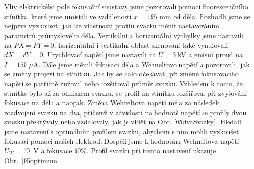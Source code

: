 Vliv elektrického pole fokusační soustavy jsme pozorovali pomocí fluorescenčního stínítka, které jsme umístili ve vzdálenosti $x = 195$ mm od děla. Rozhodli jsme se nejprve vyzkoušet, jak lze vlastnosti profilu svazku měnit nastavováním parametrů průmyslového děla. Vertikální a horizontální výchylky jsme nastavili na $PX = PY = 0$, horizontální i vertikální oblast skenování také vynulovali $dX = dY = 0$. Urychlovací napětí jsme nastavili na $U = 3$ kV a emisní proud na $I = 150$ $\mu$A. Dále jsme měnili fokusaci děla a Wehneltovo napětí a pozorovali, jak se změny projeví na stínítku. Jak by se dalo očekávat, při změně fokusovacího napětí se patřičně zužoval nebo rozšiřoval průměr svazku. Vzhledem k tomu, že stínítko bylo až za ohniskem svazku, se profil na stínítku rozšiřoval při zvyšování fokusace na dělu a naopak. Změna Wehneltova napětí měla za následek rozdvojení svazku na dva, přičemž v závislosti na hodnotě napětí se profily dvou svazků překrývaly nebo vzdalovaly, jak je vidět na Obr. \ref{05dvaSvazky}. Hledali jsme nastavení s optimálním profilem svazku, abychom s ním mohli vyzkoušet fokusaci pomocí našich elektrod. Dospěli jsme k hodnotám Wehneltova napětí $U_W = 70$~V a fokusace 60\%. Profil svazku při tomto nastavení ukazuje Obr.~\ref{05optimum}.\\

